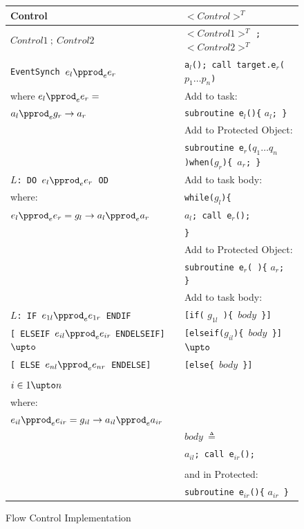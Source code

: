 \begin{figure}
\centering
\begin{tabular}{l|l}
	Control & $<Control>^T$  \\
	\hline
\rule{0pt}{3ex}$Control1~;~Control2$	&  $<Control1>^T$ \verb|;| $<Control2>^T$ \\
	\hline
%
%
\rule{0pt}{3ex}\verb|EventSynch |$e_l \pprod_e e_r$ & \verb|a|$_l$\verb|(); call target.e|$_r$\verb|(|$p_1\ldots p_n$\verb|)|  \\
where $e_l \pprod_e e_r =$ 			 	& Add to task:\\
$a_l \pprod_e g_r \rightarrow a_r$ 			& \verb|subroutine e|$_l$\verb|(){| $a_l$\verb|; }|\\
								& Add to Protected Object: \\
								& \verb|subroutine e|$_{r}$\verb|(|$q_1\ldots q_n$\verb|)when(|$g_r$\verb|){ |$a_{r}$\verb|; }| \\
%
%
\hline
$L$\verb|: DO |$e_l \pprod_e e_r$\verb| OD|				& Add to task body: \\
where:									& \verb|while(|$g_l$\verb|){|\\
 $e_l \pprod_e e_r = g_l  \rightarrow a_l \pprod_e a_r$		&\quad $a_l$\verb|;|\verb| call e|$_r$\verb|();|\\
										& \verb|}| \\
										& Add to Protected Object: \\
										& \verb|subroutine e|$_r$\verb|( ){| $a_r$\verb|; }| \\
%
%
\hline
												& Add to task body: \\
	$L$\verb|: IF |$e_{1l} \pprod_e e_{1r}$\verb| ENDIF|						& \verb|[if(| $g_{1l}$\verb| ){ |$body$\verb| }]|\\
	\quad\verb|[ ELSEIF |$e_{il} \pprod_e e_{ir}$ \verb|ENDELSEIF]|$\upto$			& \verb|[elseif(|$g_{il}$\verb|){ |$body$\verb| }]|$\upto$ \\
	\quad\verb|[ ELSE |$e_{nl} \pprod_e e_{nr}$\verb| ENDELSE]|	 			& \verb|[else{ |$body$\verb| }]| \\
												& \\
	$i \in 1\upto n$									& \\
where:											& \\
 $e_{il} \pprod_e e_{ir}=g_{il} \rightarrow a_{il} \pprod_e a_{ir}$						& \\
												& $body~\triangleq$ \\
												&\quad $a_{il}$\verb|; call e|$_{ir}$\verb|(); |\\
												& \\
												& and in Protected: \\	
												& \verb|subroutine e|$_{ir}$\verb|(){| $a_{ir}$\verb| }| 
\end{tabular}
  \caption{Flow Control Implementation}
  \label{fig:flowImpl}
\end{figure}
%
